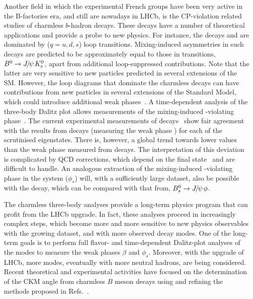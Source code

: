 Another field in which the experimental French groups have been  very active in the B-factories era, and still are nowadays in LHCb, is the CP-violation related studies of charmless $b$-hadron decays.  These decays have a number of theoretical applications and provide a probe to new physics. For instance, the decays \BdtoKsPiPi and \BdtoKsKK are dominated by \btoqqbars ($q = u,d,s$) loop transitions.  Mixing-induced \CP asymmetries in such decays are predicted to be approximately equal to those in \btoccbars transitions, \eg ${{B}^0}\rightarrow{\ensuremath{{J\mskip -3mu/\mskip -2mu\psi\mskip 2mu}}}{\ensuremath{{K}^0_{\rm\scriptscriptstyle S}}}$, apart from additional loop-suppressed contributions. Note that the latter are very sensitive to new particles predicted in several extensions of the SM.
However, the loop diagrams that dominate the charmless decays can have
contributions from new particles in several extensions of the Standard Model,
which could introduce additional weak phases~\cite{Buchalla:2005us,Grossman:1996ke,London:1997zk,Ciuchini:1997zp}.
A time-dependent analysis of the three-body Dalitz plot allows measurements of
the mixing-induced \CP-violating
phase~\cite{Dalseno:2008wwa,Aubert:2009me,Nakahama:2010nj,Lees:2012kxa}. 
 The current experimental measurements of \btoqqbars decays~\cite{HFAG} show
fair agreement with the results from \btoccbars decays (measuring the weak
phase \Pbeta) for each of the scrutinised \CP eigenstates.
There is, however, a global trend towards lower values than the weak phase
measured from \btoccbars decays.
The interpretation of this deviation is complicated by QCD
corrections, which depend on the final state~\cite{Silvestrini:2007yf} and
are difficult to handle.
An analogous extraction of the mixing-induced \CP-violating phase in the
\Bs system ($\phi_s$) will, with a sufficiently large dataset, also be possible with
the \BstoKsKPi decay, which can be compared with that from, \eg
${{B}^0_{s}}\rightarrow{\ensuremath{{J\mskip -3mu/\mskip -2mu\psi\mskip 2mu}}}\phi$.

The charmless three-body analyses provide a long-term physics program that can profit from the LHCb upgrade. In fact, these analyses proceed in increasingly complex steps, which become more and more sensitive to new physics observables with the growing dataset, and with more observed decay modes. One of the long-term goals is to perform full flavor- and time-dependent Dalitz-plot analyses of the \BstoKshhp modes to measure the weak phases $\beta$ and $\phi_s$. Moreover, with the upgrade of LHCb, more modes, eventually with more neutral hadrons, are being considered. Recent theoretical and experimental activities have focused on the determination of the CKM angle \Pgamma from charmless $B$ meson decays using and refining the methods proposed in Refs.~\cite{Ciuchini:2006kv,Gronau:2006qn,Bhattacharya:2013cla}.  




